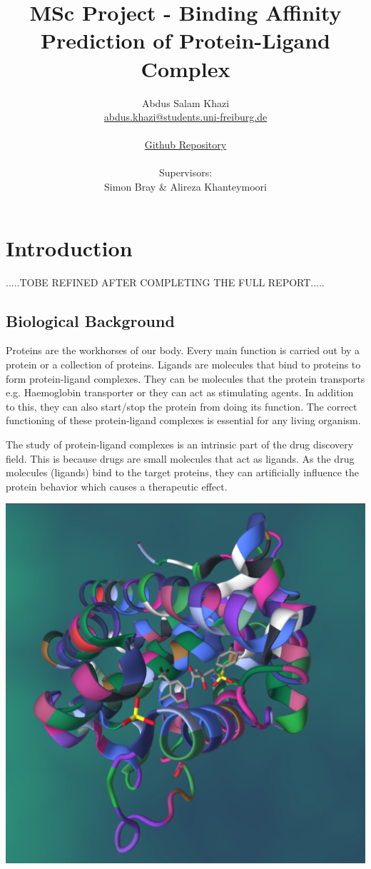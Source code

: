\documentclass[11pt]{article}
\title{MSc Project - Binding Affinity Prediction of Protein-Ligand Complex}
\author{
        Abdus Salam Khazi\\
        \href{mailto:abdus.khazi@students.uni-freiburg.de}
                {abdus.khazi@students.uni-freiburg.de}\\ \\
        \href{https://github.com/abduskhazi/MSc-Project}
                {Github Repository} \cite{github_repository} \\ \\
        Supervisors:
        \begin{tabular}{ll}
			Simon Bray \&
			Alireza Khanteymoori
		\end{tabular}
       }
\begin{document}
\maketitle
\date{}
\tableofcontents
\newpage

\section{Introduction}
.....TOBE REFINED AFTER COMPLETING THE FULL REPORT.....

\subsection{Biological Background}
Proteins are the workhorses of our body.
Every main function is carried out by a protein or a collection of proteins.
Ligands are molecules that bind to proteins to form protein-ligand complexes.
They can be molecules that the protein transports e.g. Haemoglobin transporter
or they can act as stimulating agents.
In addition to this, they can also start/stop the protein from doing its function.
The correct functioning of these protein-ligand complexes is essential for any living organism.

The study of protein-ligand complexes is an intrinsic part of the drug discovery field.
This is because drugs are small molecules that act as ligands.
As the drug molecules (ligands) bind to the target proteins, they can artificially influence
the protein behavior which causes a therapeutic effect.

\includegraphics[scale=0.15]{pl_complex}
\cite{PL_complex_introduction}
\end{document}
